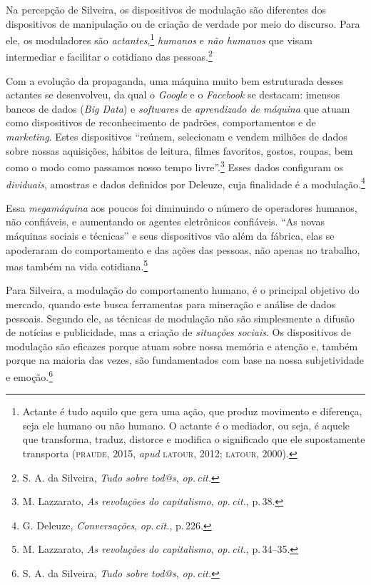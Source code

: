 Na percepção de Silveira, os dispositivos de modulação são
diferentes dos dispositivos de manipulação ou de criação de verdade por
meio do discurso. Para ele, os moduladores são
\textit{actantes},\footnote{Actante é tudo aquilo que gera uma ação, que
  produz movimento e diferença, seja ele humano ou não humano. O actante
  é o mediador, ou seja, é aquele que transforma, traduz, distorce e
  modifica o significado que ele supostamente transporta (\textsc{praude}, 2015,
  \textit{apud} \textsc{latour}, 2012; \textsc{latour}, 2000).} \textit{humanos} e \textit{não humanos} que visam intermediar e facilitar o cotidiano das pessoas.\footnote{S. A. da Silveira, \textit{Tudo sobre tod@s}, \textit{op.\,cit.}}

Com a evolução da propaganda, uma máquina muito bem estruturada desses
actantes se desenvolveu, da qual o \textit{Google} e o \textit{Facebook} se
destacam: imensos bancos de dados (\textit{Big Data}) e \textit{softwares} de
\textit{aprendizado de máquina} que atuam como dispositivos de reconhecimento de
padrões, comportamentos e de \textit{marketing}. Estes dispositivos ``reúnem,
selecionam e vendem milhões de dados sobre nossas aquisições, hábitos de
leitura, filmes favoritos, gostos, roupas, bem como o modo como passamos
nosso tempo livre''.\footnote{M. Lazzarato, \textit{As revoluções do capitalismo}, \textit{op.\,cit.}, p.\,38.} Esses dados configuram os \textit{dividuais}, amostras e dados definidos por Deleuze, cuja
finalidade é a modulação.\footnote{G. Deleuze, \textit{Conversações}, \textit{op.\,cit.}, p.\,226.}

Essa \textit{megamáquina} aos poucos foi diminuindo o número de operadores
humanos, não confiáveis, e aumentando os agentes eletrônicos
confiáveis. ``As novas máquinas sociais e técnicas'' e seus
dispositivos vão além da fábrica, elas se apoderaram do comportamento e
das ações das pessoas, não apenas no trabalho, mas também na vida
cotidiana.\footnote{M. Lazzarato, \textit{As revoluções do capitalismo}, \textit{op.\,cit.}, p.\,34--35.}

Para Silveira, a modulação do comportamento humano, é o principal
objetivo do mercado, quando este busca ferramentas para mineração e
análise de dados pessoais. Segundo ele, as técnicas de modulação não são
simplesmente a difusão de notícias e publicidade, mas a criação de
\textit{situações sociais}. Os dispositivos de modulação são eficazes porque
atuam sobre nossa memória e atenção e, também porque na maioria das
vezes, são fundamentados com base na nossa subjetividade e emoção.\footnote{S. A. da Silveira, \textit{Tudo sobre tod@s}, \textit{op.\,cit.}}

